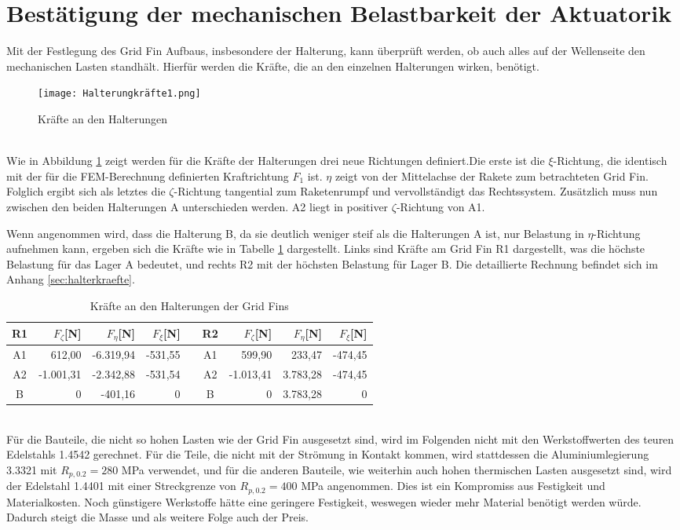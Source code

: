 \section{Bestätigung der mechanischen Belastbarkeit der Aktuatorik}
Mit der Festlegung des Grid Fin Aufbaus, insbesondere der Halterung, kann überprüft werden, ob auch alles auf der Wellenseite den mechanischen Lasten standhält. Hierfür werden die Kräfte, die an den einzelnen Halterungen wirken, benötigt.
\begin{figure}[h] 
	\centering
	\texttt{[image: Halterungkräfte1.png]}
	\caption{Kräfte an den Halterungen}
	\label{abb_richtungen_Halterungskräfte}
\end{figure}\\
Wie in Abbildung \ref{abb_richtungen_Halterungskräfte} zeigt werden für die Kräfte der Halterungen drei neue Richtungen definiert.Die erste ist die $\xi$-Richtung, die identisch mit der für die FEM-Berechnung definierten Kraftrichtung $F_1$ ist. $\eta$ zeigt von der Mittelachse der Rakete zum betrachteten Grid Fin. Folglich ergibt sich als letztes die $\zeta$-Richtung tangential zum Raketenrumpf und vervollständigt das Rechtssystem. Zusätzlich muss nun zwischen den beiden Halterungen A unterschieden werden. A2 liegt in positiver $\zeta$-Richtung von A1.

 Wenn angenommen wird, dass die Halterung B, da sie deutlich weniger steif als die Halterungen A ist, nur Belastung in $\eta$-Richtung aufnehmen kann, ergeben sich die Kräfte wie in Tabelle \ref{tab_Haltekräfte} dargestellt. Links sind Kräfte am Grid Fin R1 dargestellt, was die höchste Belastung für das Lager A bedeutet, und rechts R2 mit der höchsten Belastung für Lager B. Die detaillierte Rechnung befindet sich im Anhang \ref{sec:halterkraefte}. 
\begin{table}[h] 
	\centering 
	\begin{tabular}{c|r|r|rc||c|r|r|r} 
		\textbf{R1}&$F_{\zeta}$[N]&$F_\eta$[N]&$F_\xi$[N]&&\textbf{R2}&$F_{\zeta}$[N]&$F_\eta$[N]&$F_\xi$[N]\\ 
		\hline 
		A1& 612,00&-6.319,94&-531,55&&A1&599,90&233,47&-474,45\\
		A2&-1.001,31&-2.342,88&-531,54&&A2&-1.013,41&3.783,28&-474,45\\
		B&0&-401,16&0&&B&0&3.783,28&0\\
	\end{tabular}
\caption{Kräfte an den Halterungen der Grid Fins}
\label{tab_Haltekräfte}
\end{table} \\
Für die Bauteile, die nicht so hohen Lasten wie der Grid Fin ausgesetzt sind, wird im Folgenden nicht mit den Werkstoffwerten des teuren Edelstahls 1.4542 gerechnet. Für die Teile, die nicht mit der Strömung in Kontakt kommen, wird stattdessen die Aluminiumlegierung 3.3321 mit $R_{p,0.2} = 280$ MPa verwendet, und für die anderen Bauteile, wie weiterhin auch hohen thermischen Lasten ausgesetzt sind, wird der Edelstahl 1.4401 mit einer Streckgrenze von $R_{p,0.2} = 400$ MPa angenommen. Dies ist ein Kompromiss aus Festigkeit und Materialkosten. Noch günstigere Werkstoffe hätte eine geringere Festigkeit, weswegen wieder mehr Material benötigt werden würde. Dadurch steigt die Masse und als weitere Folge auch der Preis.

